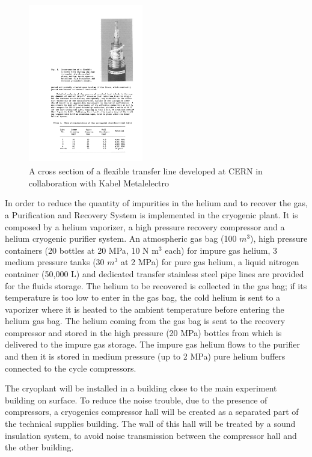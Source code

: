 \FloatBarrier
\begin{figure}[htbp]
\begin{center}
\includegraphics[width=5cm, height=7cm]{./Sec_SiteInfra/Figures/transfer_line.pdf}
\caption{A cross section of a flexible transfer line developed at CERN in collaboration with Kabel Metalelectro~\cite{Lebrun}}
\label{fig:transfer_line}
\end{center}
\end{figure}


In order to reduce the quantity of impurities in the helium and to recover the gas, a  Purification and Recovery System is implemented in the cryogenic plant. It is composed by a helium vaporizer, a high pressure recovery compressor and a helium cryogenic purifier system. An atmospheric gas bag (100 $m^3$), high pressure containers (20 bottles at 20 MPa, 10 N m$^3$ each) for impure gas helium, 3 medium pressure tanks (30 $m^3$ at 2 MPa) for pure gas helium, a liquid nitrogen container (50,000 L) and dedicated transfer stainless steel pipe lines are provided for the fluids storage. The helium to be recovered is collected in the gas bag; if its temperature is too low to enter in the gas bag, the cold helium is sent to a vaporizer where it is heated to the ambient temperature before entering the helium gas bag. The helium coming from the gas bag is sent to the recovery compressor and stored in the high pressure (20 MPa) bottles from which is delivered to the impure gas storage. The impure gas helium flows to the purifier and then it is stored in medium pressure (up to 2 MPa) pure helium buffers connected to the cycle compressors.





The cryoplant will be installed in a building close to the main experiment building on surface. To reduce the noise trouble, due to the presence of compressors, a cryogenics compressor hall will be created as a separated part of the technical supplies building. The wall of this hall will be treated by a sound insulation system, to avoid noise transmission between the compressor hall and the other building. 




